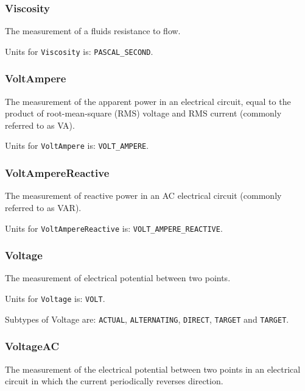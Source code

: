 \subsubsection{Viscosity}
  \label{sec:Viscosity}


The measurement of a fluids resistance to flow.


Units for \texttt{Viscosity} is: \texttt{PASCAL_SECOND}.

\FloatBarrier

\subsubsection{VoltAmpere}
  \label{sec:VoltAmpere}


The measurement of the apparent power in an electrical circuit, equal to the product of root-mean-square (RMS) voltage and RMS current (commonly referred to as VA).


Units for \texttt{VoltAmpere} is: \texttt{VOLT_AMPERE}.

\FloatBarrier

\subsubsection{VoltAmpereReactive}
  \label{sec:VoltAmpereReactive}


The measurement of reactive power in an AC electrical circuit (commonly referred to as VAR).


Units for \texttt{VoltAmpereReactive} is: \texttt{VOLT_AMPERE_REACTIVE}.

\FloatBarrier

\subsubsection{Voltage}
  \label{sec:Voltage}


The measurement of electrical potential between two points.


Units for \texttt{Voltage} is: \texttt{VOLT}.


Subtypes of Voltage are: \texttt{ACTUAL}, \texttt{ALTERNATING}, \texttt{DIRECT}, \texttt{TARGET} and \texttt{TARGET}. 
\FloatBarrier

\subsubsection{VoltageAC}
  \label{sec:VoltageAC}


The measurement of the electrical potential between two points in an electrical circuit in which the current periodically reverses direction.


